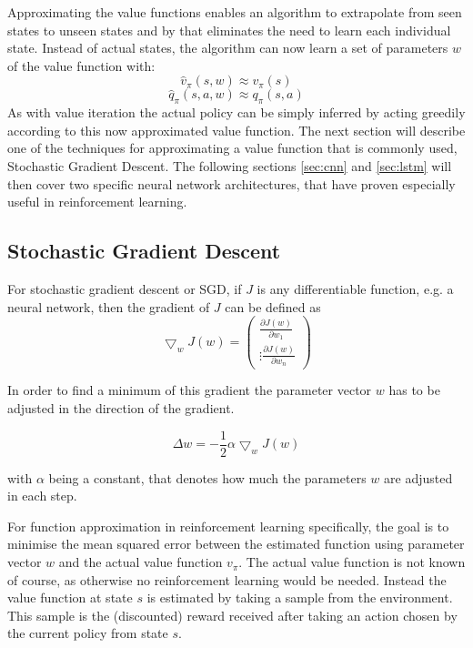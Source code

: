 Approximating the value functions enables an algorithm to extrapolate from seen states to unseen states and by that eliminates the need to learn each individual state. Instead of actual states, the algorithm can now learn a set of parameters $w$ of the value function with:
$$\hat{v} _\pi(s, w) \approx v_\pi(s) $$
$$\hat{q} _\pi(s, a, w) \approx q_\pi(s, a) $$
As with value iteration the actual policy can be simply inferred by acting greedily according to this now approximated value function.
The next section will describe one of the techniques for approximating a value function that is commonly used, Stochastic Gradient Descent. The following sections \ref{sec:cnn} and \ref{sec:lstm}
will then cover two specific neural network architectures, that have proven especially useful in reinforcement learning.

\subsection{Stochastic Gradient Descent}
\label{sec:sgd}
For stochastic gradient descent or SGD, if $J$ is any differentiable function, e.g. a neural network, then the gradient of $J$ can be defined as 
$$\bigtriangledown_wJ(w)=
\begin{pmatrix}
\frac{\partial J(w)}{\partial w_1} \\
\vdots
\frac{\partial J(w)}{\partial w_n}
\end{pmatrix}
$$

In order to find a minimum of this gradient the parameter vector $w$ has to be adjusted in the direction of the gradient.

$$ \Delta w = -\frac{1}{2}\alpha\bigtriangledown_wJ(w)$$

with $\alpha$ being a constant, that denotes how much the parameters $w$ are adjusted in each step.

For function approximation in reinforcement learning specifically, the goal is to minimise the mean squared error between the estimated function using parameter vector $w$ and the actual value function $v_\pi$. The actual value function is not known of course, as otherwise no reinforcement learning would be needed. Instead the value function at state $s$ is estimated by taking a sample from the environment. This sample is the (discounted) reward received after taking an action chosen by the current policy from state $s$. 


